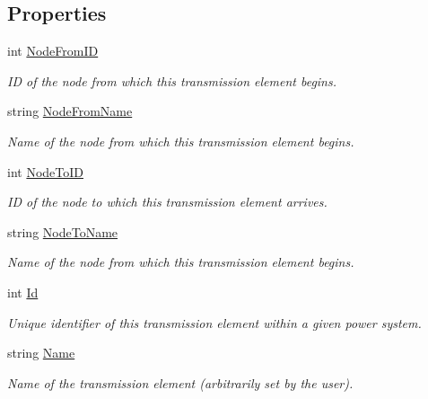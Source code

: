 \subsection*{Properties}
\begin{DoxyCompactItemize}
\item 
int \hyperlink{class_power_system_planning_1_1_transmission_element_a050027a75710ba42d4d742cf78889f29}{Node\+From\+ID}
\begin{DoxyCompactList}\small\item\em ID of the node from which this transmission element begins. \end{DoxyCompactList}\item 
string \hyperlink{class_power_system_planning_1_1_transmission_element_a6595ed8a111ff217d5437cc747b3a7c3}{Node\+From\+Name}
\begin{DoxyCompactList}\small\item\em Name of the node from which this transmission element begins. \end{DoxyCompactList}\item 
int \hyperlink{class_power_system_planning_1_1_transmission_element_a670796e35f8f4af35326cfc1dd1b104f}{Node\+To\+ID}
\begin{DoxyCompactList}\small\item\em ID of the node to which this transmission element arrives. \end{DoxyCompactList}\item 
string \hyperlink{class_power_system_planning_1_1_transmission_element_ad6028ae3c8e7ac1527cfde854c81dedd}{Node\+To\+Name}
\begin{DoxyCompactList}\small\item\em Name of the node from which this transmission element begins. \end{DoxyCompactList}\item 
int \hyperlink{class_power_system_planning_1_1_transmission_element_a2a3a213849ad09bfc8a52d13e9d7a0e2}{Id}
\begin{DoxyCompactList}\small\item\em Unique identifier of this transmission element within a given power system. \end{DoxyCompactList}\item 
string \hyperlink{class_power_system_planning_1_1_transmission_element_a5147d0e7710dbb8d28988a40c9e8ac3c}{Name}
\begin{DoxyCompactList}\small\item\em Name of the transmission element (arbitrarily set by the user). \end{DoxyCompactList}\end{DoxyCompactItemize}


